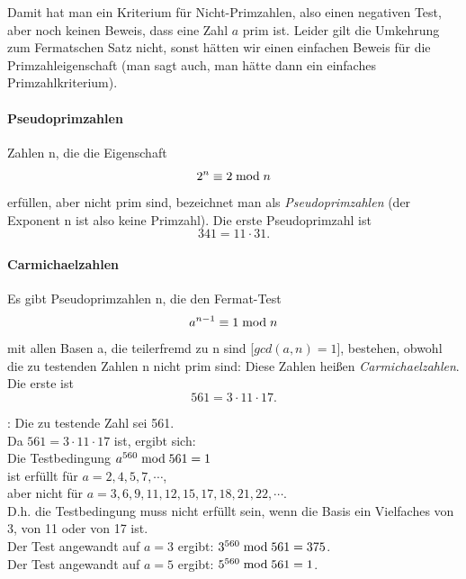 \begin{refsegment}
Damit hat man ein Kriterium für Nicht-Primzahlen, also einen negativen
Test, aber noch keinen Beweis, dass eine Zahl $a$ prim ist.
Leider gilt die Umkehrung zum Fermatschen Satz nicht, sonst hätten
wir einen einfachen Beweis für die Primzahleigenschaft (man sagt auch,
man hätte dann ein einfaches Primzahlkriterium).


\paragraph*{Pseudoprimzahlen}%
%
\hypertarget{HT-Pseudoprimenumber01}{}\label{L-Pseudoprimenumber01}%

Zahlen n, die die Eigenschaft
$$ 2^n \equiv 2 \;{\rm mod}\; n $$
erfüllen, aber nicht prim sind, bezeichnet man als {\em Pseudoprimzahlen}
(der Exponent n ist also keine Primzahl).
Die erste Pseudoprimzahl ist $$ 341 = 11 \cdot 31 .$$


\paragraph*{Carmichaelzahlen}%
%
\hypertarget{HT-Carmichael-number01}{}\label{L-Carmichael-number01}%

Es gibt Pseudoprimzahlen n, die den Fermat-Test
$$ a^{n-1} \equiv 1 \;{\rm mod}\; n $$
mit allen Basen a, die teilerfremd zu n sind [$ gcd (a,n) = 1 $], bestehen,
obwohl die zu testenden Zahlen n nicht prim sind: Diese Zahlen heißen
{\em Carmichaelzahlen}. Die erste ist
$$ 561 = 3 \cdot 11 \cdot 17 .$$

\begin{example}{: Die zu testende Zahl sei 561.}\\
Da $561 = 3 \cdot 11 \cdot 17$ ist, ergibt sich: \\
Die Testbedingung $a^{560} \;{\rm mod}\; 561 = 1$ \\
ist erfüllt für $a = 2, 4, 5, 7, \cdots $, \\
aber nicht für $a = 3, 6, 9, 11, 12, 15, 17, 18, 21, 22, \cdots$.\\
D.h. die Testbedingung muss nicht erfüllt sein, wenn die Basis ein
Vielfaches von 3, von 11 oder von 17 ist.\\
Der Test angewandt auf $a=3$ ergibt: $3^{560} \;{\rm mod}\; 561 = 375$. \\
Der Test angewandt auf $a=5$ ergibt: $5^{560} \;{\rm mod}\; 561 = 1$.
\end{example}


\end{refsegment}
